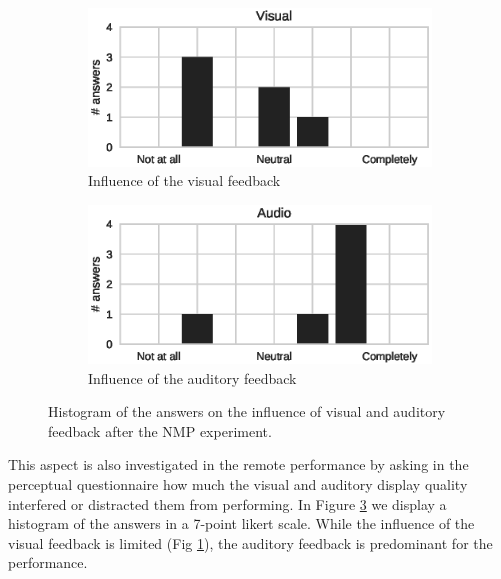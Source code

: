 \begin{figure}[b]
	\centering
	\begin{subfigure}[t]{.48\columnwidth}
		\centering        
		\includegraphics[trim={.5cm 0cm 1cm 0cm},clip,width=\textwidth]{img/Visual}
		\caption{Influence of the visual feedback}
		\label{subfig:visual}
	\end{subfigure}
	\begin{subfigure}[t]{.48\columnwidth}
		\centering        
		\includegraphics[trim={1.5cm 0cm 0cm 0cm},clip,width=\textwidth]{img/Audio}
		\caption{Influence of the auditory feedback}
		\label{subfig:audio}
	\end{subfigure}
	\quad 
	\caption{Histogram of the answers on the influence of visual and auditory feedback after the NMP experiment.}\label{fig:va}
\end{figure}  

This aspect is also investigated in the remote performance by asking in the perceptual questionnaire how much the visual and auditory display quality interfered or distracted them from performing. In Figure \ref{fig:va} we display a histogram of the answers in a 7-point likert scale. While the influence of the visual feedback is limited (Fig \ref{subfig:visual}), the auditory feedback is predominant for the performance.


